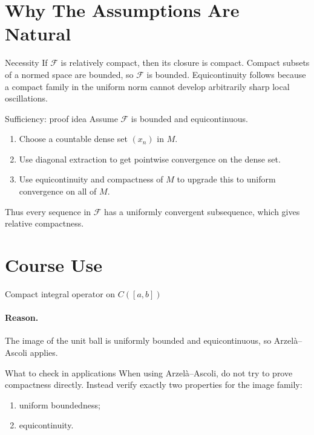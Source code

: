 \documentclass[header={Appendix A Exam Study Notes}]{study-note}
\begin{document}
\section{Why The Assumptions Are Natural}

\begin{exbox}{Necessity}
If $\mathcal F$ is relatively compact, then its closure is compact. Compact subsets of a normed space are bounded, so $\mathcal F$ is bounded. Equicontinuity follows because a compact family in the uniform norm cannot develop arbitrarily sharp local oscillations.
\end{exbox}

\begin{exbox}{Sufficiency: proof idea}
Assume $\mathcal F$ is bounded and equicontinuous.
\begin{enumerate}
\item Choose a countable dense set $(x_n)$ in $M$.
\item Use diagonal extraction to get pointwise convergence on the dense set.
\item Use equicontinuity and compactness of $M$ to upgrade this to uniform convergence on all of $M$.
\end{enumerate}
Thus every sequence in $\mathcal F$ has a uniformly convergent subsequence, which gives relative compactness.
\end{exbox}

\section{Course Use}

\begin{thmbox}{Compact integral operator on $C([a,b])$}
\thmIntegralOperator
\end{thmbox}

\paragraph{Reason.}
The image of the unit ball is uniformly bounded and equicontinuous, so Arzel\`a--Ascoli applies.

\begin{warningbox}{What to check in applications}
When using Arzel\`a--Ascoli, do not try to prove compactness directly. Instead verify exactly two properties for the image family:
\begin{enumerate}
\item uniform boundedness;
\item equicontinuity.
\end{enumerate}
\end{warningbox}
\end{document}
